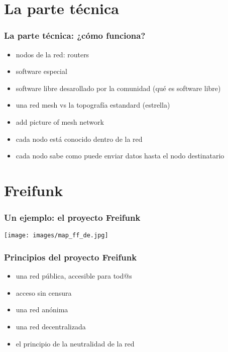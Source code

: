 \documentclass[12pt, xcolor=table]{beamer}
\begin{document}
\section{La parte técnica}
\begin{frame}
  \frametitle{La parte técnica: ¿cómo funciona?}
    \begin{itemize}
      \item nodos de la red: routers
      \item software especial
      \item software libre desarollado por la comunidad (qué es software libre)
      \item una red mesh vs la topografía estandard (estrella)
      \item add picture of mesh network
      \item cada nodo está conocido dentro de la red
      \item cada nodo sabe como puede enviar datos hasta el nodo destinatario
    \end{itemize}
\end{frame}

\section{Freifunk}
\begin{frame}
  \frametitle{Un ejemplo: el proyecto Freifunk}
  \vspace{50pt}
    \texttt{[image: images/map\_ff\_de.jpg]}
\end{frame}

\begin{frame}
  \frametitle{Principios del proyecto Freifunk}
  \begin{itemize}
    \item una red pública, accesible para tod@s
    \item acceso sin censura
    \item una red anónima
    \item una red decentralizada
    \item el principio de la neutralidad de la red
  \end{itemize}
\end{frame}

\begin{comment}
\begin{frame}
  \frametitle{Un ejemplo: el proyecto Freifunk}
  \begin{itemize}
    \item comunidades locales por toda Alemania
    \item la estructura en Berlín: backbones, etc
    \item principios de la comunidad Freifunk?
    \item conectar a residencias de asilad@s/refugiad@s
    \item el principio de la neutralidad de la red
    \item add logo
  \end{itemize}
\end{frame}
\end{comment}
\end{document}
